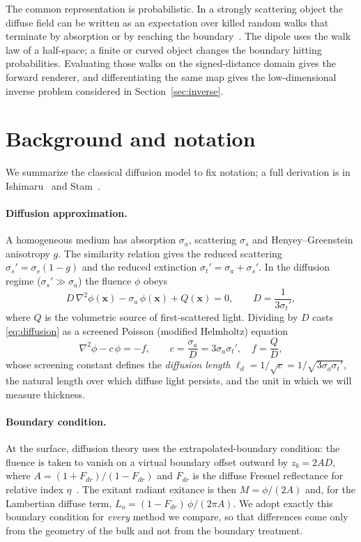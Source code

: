 \documentclass[11pt]{article}
\newcommand{\sa}{\sigma_a}
\newcommand{\sgs}{\sigma_s}
\newcommand{\stp}{\sigma_t'}
\newcommand{\ssp}{\sigma_s'}
\newcommand{\ld}{\ell_d}
\begin{document}
The common representation is probabilistic. In a strongly scattering object the
diffuse field can be written as an expectation over killed random walks that
terminate by absorption or by reaching the boundary~\cite{muller1956}. The dipole
uses the walk law of a half-space; a finite or curved object changes the boundary
hitting probabilities. Evaluating those walks on the signed-distance domain gives
the forward renderer, and differentiating the same map gives the low-dimensional
inverse problem considered in Section~\ref{sec:inverse}.

\section{Background and notation}
\label{sec:bg}
We summarize the classical diffusion model to fix notation; a full derivation is
in Ishimaru~\cite{ishimaru1978} and Stam~\cite{stam1995}.

\paragraph{Diffusion approximation.}
A homogeneous medium has absorption $\sa$, scattering $\sgs$ and
Henyey--Greenstein anisotropy $g$. The similarity relation gives the reduced
scattering $\ssp=\sgs(1-g)$ and the reduced extinction $\stp=\sa+\ssp$. In the
diffusion regime ($\ssp\gg\sa$) the fluence $\phi$ obeys
\begin{equation}
  D\,\nabla^2\phi(\mathbf{x}) - \sa\,\phi(\mathbf{x}) + Q(\mathbf{x}) = 0,
  \qquad D=\frac{1}{3\stp},
  \label{eq:diffusion}
\end{equation}
where $Q$ is the volumetric source of first-scattered light. Dividing by $D$
casts \eqref{eq:diffusion} as a screened Poisson (modified Helmholtz) equation
\begin{equation}
  \nabla^2\phi - c\,\phi = -f,\qquad c=\frac{\sa}{D}=3\sa\stp,\quad f=\frac{Q}{D},
  \label{eq:screened}
\end{equation}
whose screening constant defines the \emph{diffusion length}
$\ld = 1/\sqrt{c} = 1/\sqrt{3\sa\stp}$, the natural length over which diffuse
light persists, and the unit in which we will measure thickness.

\paragraph{Boundary condition.}
At the surface, diffusion theory uses the extrapolated-boundary condition: the
fluence is taken to vanish on a virtual boundary offset outward by
$z_b = 2AD$, where $A=(1+F_{dr})/(1-F_{dr})$ and $F_{dr}$ is the diffuse Fresnel
reflectance for relative index $\eta$~\cite{jensen2001}. The exitant radiant
exitance is then $M=\phi/(2A)$ and, for the Lambertian diffuse term,
$L_o = (1-F_{dr})\,\phi/(2\pi A)$. We adopt exactly this boundary condition for
\emph{every} method we compare, so that differences come only from the geometry
of the bulk and not from the boundary treatment.
\end{document}
